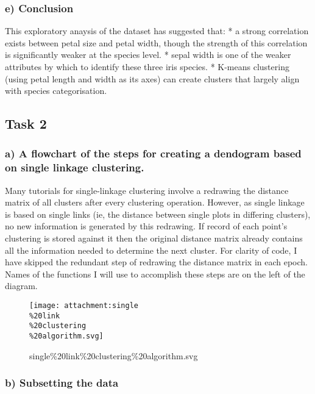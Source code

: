 \documentclass[11pt]{article}
\begin{document}
\hypertarget{e-conclusion}{%
\subsubsection{e) Conclusion}\label{e-conclusion}}

This exploratory anaysis of the dataset has suggested that: * a strong
correlation exists between petal size and petal width, though the
strength of this correlation is significantly weaker at the species
level. * sepal width is one of the weaker attributes by which to
identify these three iris species. * K-means clustering (using petal
length and width as its axes) can create clusters that largely align
with species categorisation.

\hypertarget{task-2}{%
\subsection{Task 2}\label{task-2}}

\hypertarget{a-a-flowchart-of-the-steps-for-creating-a-dendogram-based-on-single-linkage-clustering.}{%
\subsubsection{a) A flowchart of the steps for creating a dendogram
based on single linkage
clustering.}\label{a-a-flowchart-of-the-steps-for-creating-a-dendogram-based-on-single-linkage-clustering.}}

Many tutorials for single-linkage clustering involve a redrawing the
distance matrix of all clusters after every clustering operation.
However, as single linkage is based on single links (ie, the distance
between single plots in differing clusters), no new information is
generated by this redrawing. If record of each point's clustering is
stored against it then the original distance matrix already contains all
the information needed to determine the next cluster. For clarity of
code, I have skipped the redundant step of redrawing the distance matrix
in each epoch. Names of the functions I will use to accomplish these
steps are on the left of the diagram.

\begin{figure}
\centering
\texttt{[image: attachment:single\\\%20link\\\%20clustering\\\%20algorithm.svg]}
\caption{single\%20link\%20clustering\%20algorithm.svg}
\end{figure}

    \hypertarget{b-subsetting-the-data}{%
\subsubsection{b) Subsetting the data}\label{b-subsetting-the-data}}
\end{document}
